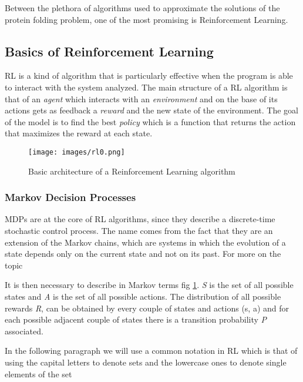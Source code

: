 Between the plethora of algorithms used to approximate the solutions of the protein folding problem, one of the most promising is Reinforcement Learning.

\subsection{Basics of Reinforcement Learning} \label{BRL}

RL is a kind of algorithm that is particularly effective when the program is able to interact with the system analyzed.
The main structure of a RL algorithm is that of an \emph{agent} which interacts with an \emph{environment} and on the base of its actions gets as feedback a \emph{reward} and the new state of the environment.
The goal of the model is to find the best \emph{policy} which is a function that returns the action that maximizes the reward at each state.

\FloatBarrier
\begin{figure}[H]
    \centering
    \texttt{[image: images/rl0.png]}
    \caption{Basic architecture of a Reinforcement Learning algorithm}
    \label{fig:rl0}
\end{figure}
\FloatBarrier

\subsubsection{Markov Decision Processes}

MDPs are at the core of RL algorithms, since they describe a discrete-time stochastic control process.
The name comes from the fact that they are an extension of the Markov chains, which are systems in which the evolution of a state depends only on the current state and not on its past.
For more on the topic 


It is then necessary to describe in Markov terms fig \ref{fig:rl0}.
\emph{S} is the set of all possible states and \emph{A} is the set of all possible actions.
The distribution of all possible rewards \emph{R}, can be obtained by every couple of states and actions (s, a) and for each possible adjacent couple of states there is a transition probability \emph{P} associated.

In the following paragraph we will use a common notation in RL which is that of using the capital letters to denote sets and the lowercase ones to denote single elements of the set

